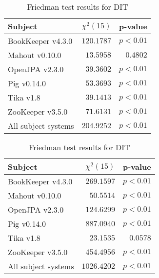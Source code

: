 \begin{table}
\begin{spacing}{1.2}
\centering
\parbox{.45\linewidth}{
\centering
\caption{Friedman test results for FLT}
\label{table:combo-friedman-flt}
\begin{tabular}{lrr}
\toprule
                      Subject & $\chi^2(15)$ &  p-value \\
\midrule
            BookKeeper v4.3.0 &   $120.1787$ & $p<0.01$ \\
               Mahout v0.10.0 &    $13.5958$ & $0.4802$ \\
               OpenJPA v2.3.0 &    $39.3602$ & $p<0.01$ \\
                  Pig v0.14.0 &    $53.3693$ & $p<0.01$ \\
                    Tika v1.8 &    $39.1413$ & $p<0.01$ \\
             ZooKeeper v3.5.0 &    $71.6131$ & $p<0.01$ \\
 \midrule
All subject systems &   $204.9252$ & $p<0.01$ \\
\bottomrule
\end{tabular}
}
\hfill
\parbox{.45\linewidth}{
\centering
\caption{Friedman test results for DIT}
\label{table:combo-friedman-dit}
\begin{tabular}{lrr}
\toprule
                      Subject & $\chi^2(15)$ &  p-value \\
\midrule
            BookKeeper v4.3.0 &   $269.1597$ & $p<0.01$ \\
               Mahout v0.10.0 &    $50.5514$ & $p<0.01$ \\
               OpenJPA v2.3.0 &   $124.6299$ & $p<0.01$ \\
                  Pig v0.14.0 &   $887.0940$ & $p<0.01$ \\
                    Tika v1.8 &    $23.1535$ & $0.0578$ \\
             ZooKeeper v3.5.0 &   $454.4956$ & $p<0.01$ \\
 \midrule
All subject systems &  $1026.4202$ & $p<0.01$ \\
\bottomrule
\end{tabular}
}
\end{spacing}
\end{table}

